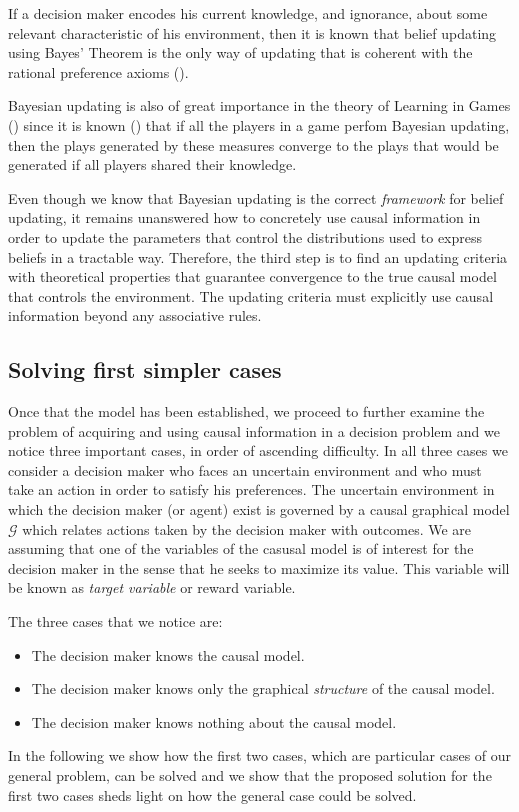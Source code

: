 \documentclass[english,letterpaper,12pt,final]{article}
\theoremstyle{definition}
\begin{document}
If a decision maker encodes his current knowledge, and ignorance, about some relevant characteristic of his environment, then it is known that belief updating using Bayes' Theorem is the only way of updating that is coherent with the rational preference axioms (\cite{bernardo2000bayesian}). 

Bayesian updating is also of great importance in the theory of Learning in Games (\cite{fudenberg1998theory}) since it is known (\cite{shoham2008multiagent}) that if all the players in a game perfom Bayesian updating, then the plays generated by these measures converge to the plays that would be generated if all players shared their knowledge.

Even though we know that Bayesian updating is the correct \textit{framework} for belief updating, it remains unanswered how to concretely use causal information in order to update the parameters that control the distributions used to express beliefs in a tractable way. Therefore, the third step is to find an updating criteria with theoretical properties that guarantee convergence to the true causal model that controls the environment. The updating criteria must explicitly use causal information beyond any associative rules. 

\subsection{Solving first simpler cases}
Once that the model has been established, we proceed to further examine the problem of acquiring and using causal information in a decision problem and we notice three important cases, in order of ascending difficulty. In all three cases we consider a decision maker who faces an uncertain environment and who must take an action in order to satisfy his preferences. The uncertain environment in which the decision maker (or agent) exist is governed by a causal graphical model $\mathcal{G}$ which relates actions taken by the decision maker with outcomes. We are assuming that one of the variables of the casusal model is of interest for the decision maker in the sense that he seeks to maximize its value. This variable will be known as \textit{target variable} or reward variable.

The three cases that we notice are:
\begin{itemize}
\item The decision maker knows the causal model.
\item The decision maker knows only the graphical \textit{structure} of the causal model.
\item The decision maker knows nothing about the causal model. 
\end{itemize}
In the following we show how the first two cases, which are particular cases of our general problem, can be solved and we show that the proposed solution for the first two cases sheds light on how the general case could be solved.
\end{document}
